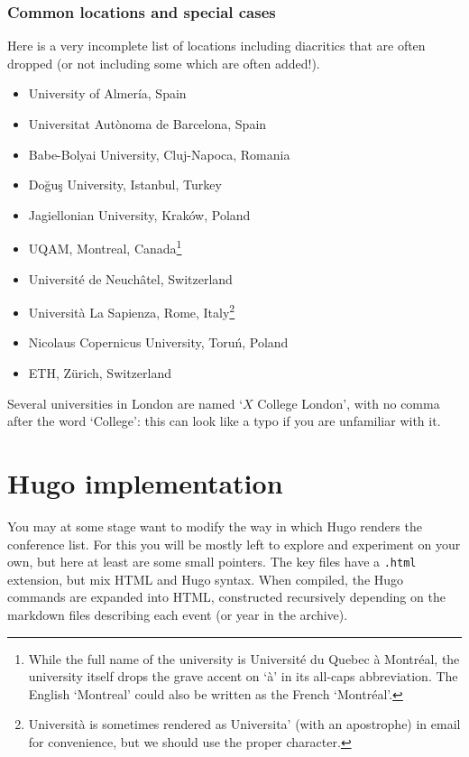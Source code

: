 \documentclass[12pt]{scrartcl}
\theoremstyle{definition}
\begin{document}
\subsubsection{Common locations and special cases}
Here is a very incomplete list of locations including diacritics that are often dropped (or not including some which are often added!).
\begin{itemize}[noitemsep]
\item University of Almería, Spain
\item Universitat Autònoma de Barcelona, Spain
\item Babe-Bolyai University, Cluj-Napoca, Romania
\item Doğuş University, Istanbul, Turkey
\item Jagiellonian University, Kraków, Poland
\item UQAM, Montreal, Canada\footnote{While the full name of the university is Université du Quebec à Montréal, the university itself drops the grave accent on `à' in its all-caps abbreviation. The English `Montreal' could also be written as the French `Montréal'.}
\item Université de Neuchâtel, Switzerland
\item Università La Sapienza, Rome, Italy\footnote{Università is sometimes rendered as Universita' (with an apostrophe) in email for convenience, but we should use the proper character.}
\item Nicolaus Copernicus University, Toruń, Poland
\item ETH, Zürich, Switzerland
\end{itemize}

Several universities in London are named `$X$ College London', with no comma after the word `College': this can look like a typo if you are unfamiliar with it.

\section{Hugo implementation}

You may at some stage want to modify the way in which Hugo renders the conference list.
For this you will be mostly left to explore and experiment on your own, but here at least are some small pointers.
The key files have a \verb|.html| extension, but mix HTML and Hugo syntax.
When compiled, the Hugo commands are expanded into HTML, constructed recursively depending on the markdown files describing each event (or year in the archive).
\end{document}
